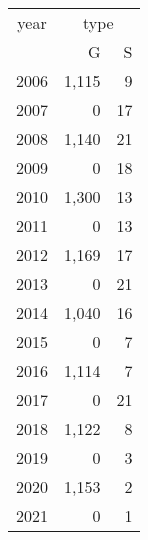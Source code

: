 \footnotesize\begin{tabular}[t]{lrr}
\toprule
\multicolumn{1}{c}{year} & \multicolumn{2}{c}{type} \\
\cmidrule(l{3pt}r{3pt}){1-1} \cmidrule(l{3pt}r{3pt}){2-3}
  & G & S\\
\midrule
2006 & 1,115 & 9\\
2007 & 0 & 17\\
2008 & 1,140 & 21\\
2009 & 0 & 18\\
2010 & 1,300 & 13\\
2011 & 0 & 13\\
2012 & 1,169 & 17\\
2013 & 0 & 21\\
2014 & 1,040 & 16\\
2015 & 0 & 7\\
2016 & 1,114 & 7\\
2017 & 0 & 21\\
2018 & 1,122 & 8\\
2019 & 0 & 3\\
2020 & 1,153 & 2\\
2021 & 0 & 1\\
\bottomrule
\end{tabular}
